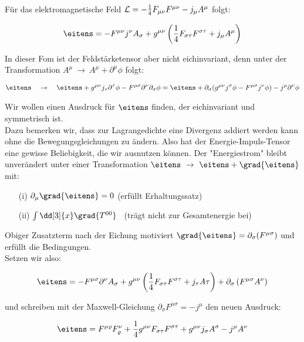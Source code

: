 Für das elektromagnetische Feld $\mathcal{L} = -\frac{1}{4} F_{\mu \nu} F^{\mu \nu} - j_{\mu}A^{\mu}$ folgt:

\begin{align*}
\eitens = - \fu j^{\nu}A_{\sigma}+g^{\mu\nu}\left( \frac{1}{4} F_{\sigma\tau}F^{\sigma\tau}+j_{\mu}A^{\mu}\right)
\end{align*}

In dieser Fom ist der Feldstärketensor aber nicht eichinvariant, denn unter der Transformation $A^{\mu} \ \rightarrow \ A^{\mu} + \partial^{\mu}\phi$ folgt:

\begin{align*}
\eitens \quad \rightarrow \quad \eitens + g^{\mu\nu}j_{\tau}\partial^{\tau}\phi-F^{\mu\sigma}\partial^{\nu}\partial_{\sigma}\phi = \eitens + \partial_{\sigma}(g^{\mu\nu}j^{\sigma}\phi - F^{\mu\sigma}j^{\nu}\phi) - j^{\mu}\partial^{\nu}\phi
\end{align*}

Wir wollen einen Ausdruck für $\eitens$ finden, der eichinvariant und symmetrisch ist. \\
Dazu bemerken wir, dass zur Lagrangedichte eine Divergenz addiert werden kann ohne die Bewegungsgleichungen zu ändern. Also hat der Energie-Impuls-Tensor eine gewisse Beliebigkeit, die wir ausnutzen können. 
\newpage
Der "Energiestrom" bleibt unverändert unter einer Transformation $\eitens \ \rightarrow \ \eitens+ \grad{\eitens}$ mit: 

\begin{enumerate}
\item[(i)] $\partial_{\mu}\grad{\eitens}=0$ \qquad (erfüllt Erhaltungssatz)
\item[(ii)] $ \int \dd[3]{x} \grad{T^{00}}$ \qquad \ (trägt nicht zur Gesamtenergie bei)
\end{enumerate}

Obiger Zusatzterm nach der Eichung motiviert $\grad{\eitens}=\partial_{\sigma}(F^{\mu\sigma})$ und erfüllt die Bedingungen. \\
Setzen wir also:

\begin{align*}
\eitens = -F^{\mu\sigma}\partial^{\nu}A_{\sigma} + g^{\mu\nu}\left( \frac{1}{4}F_{\sigma\tau}F^{\sigma\tau} + j_{\tau}A{\tau} \right) + \partial_{\sigma} \left(F^{\mu\sigma}A^{\nu} \right)
\end{align*}

und schreiben mit der Maxwell-Gleichung $\partial_{\sigma}F^{\mu\sigma}=-j^{\mu}$ den neuen Ausdruck:

\begin{align}
\eitens = F^{\mu\varrho}F_{\varrho}^{\nu} + \frac{1}{4}g^{\mu\nu}F_{\sigma\tau}F^{\sigma\tau} + g^{\mu\nu}j_{\sigma}A^{\sigma} - j^{\mu}A^{\nu}
\end{align}

